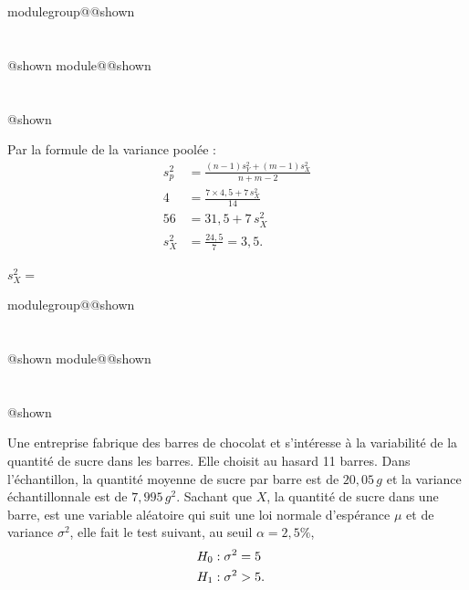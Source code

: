 \documentclass{Evaluation}
\makeatletter
\newcommand{\currentmodulekey}{}
\newcommand{\currentmoduletitle}{}
\newcommand{\currentgroupkey}{}
\newcommand{\currentgrouptitle}{}
\newcommand{\showmoduleifneeded}{%
  \ifx\currentgroupkey\empty\else
    \expandafter\ifx\csname modulegroup@\currentgroupkey @shown\endcsname\relax
      \section*{\currentgrouptitle}%
      \expandafter\gdef\csname modulegroup@\currentgroupkey @shown\endcsname{1}%
    \fi
  \fi
  \expandafter\ifx\csname module@\currentmodulekey @shown\endcsname\relax
    \section*{\currentmoduletitle}%
    \expandafter\gdef\csname module@\currentmodulekey @shown\endcsname{1}%
  \fi
}
\newenvironment{A23}{\showmoduleifneeded}{}
\newenvironment{H26}{\showmoduleifneeded}{}
\makeatother
\begin{document}
\begin{questions}
\begin{A23}
\begin{solution}
Par la formule de la variance poolée :
\begin{align*}
s_p^2 &= \frac{(n-1)s_Y^2 + (m-1)s_X^2}{n+m-2} \\
4 &= \frac{7\times 4{,}5 + 7\,s_X^2}{14} \\
56 &= 31{,}5 + 7\,s_X^2 \\
s_X^2 &= \frac{24{,}5}{7} = 3{,}5.
\end{align*}
\end{solution}

$s^2_X=$ 
\end{A23}

\begin{H26}
\question {} %
Une entreprise fabrique des barres de chocolat et s'intéresse à la variabilité de la quantité de sucre dans les barres. Elle choisit au hasard 11 barres. Dans l'échantillon, la quantité moyenne de sucre par barre est de $20,05 \,g$ et la variance échantillonnale est de $7,995\, g^2$. Sachant que $X$, la quantité de sucre dans une barre, est une variable aléatoire qui suit une loi normale d'espérance $\mu$ et de variance $\sigma^2$, elle fait le test suivant, au seuil $\alpha=2,5\%$,
\begin{align*}
	H_0 &: \sigma^2 = 5 \cr
	H_1 &: \sigma^2 > 5.
\end{align*}

\end{H26}
\end{questions}
\end{document}
